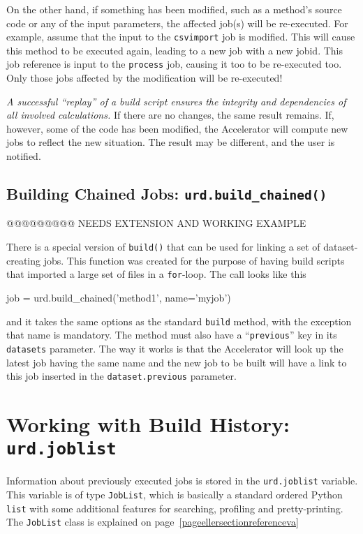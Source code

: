 On the other hand, if something has been modified, such as a method's
source code or any of the input parameters, the affected job(s) will
be re-executed.  For example, assume that the input to
the \texttt{csvimport} job is modified.  This will cause this method
to be executed again, leading to a new job with a new jobid.  This job
reference is input to the \texttt{process} job, causing it too to be
re-executed too.  Only those jobs affected by the modification will be
re-executed!

\textsl{A successful ``replay'' of a build script ensures the integrity and
dependencies of all involved calculations.}  If there are no changes,
the same result remains.  If, however, some of the code has been
modified, the Accelerator will compute new jobs to reflect the new
situation.  The result may be different, and the user is notified.



\subsection{Building Chained Jobs: \texttt{urd.build\_chained()}}

@@@@@@@@@ NEEDS EXTENSION AND WORKING EXAMPLE

There is a special version of \texttt{build()} that can be used for
linking a set of dataset-creating jobs.  This function was created for
the purpose of having build scripts that imported a large set of files
in a \texttt{for}-loop.  The call looks like this
\begin{python}
job = urd.build_chained('method1', name='myjob')
\end{python}
and it takes the same options as the standard \texttt{build} method,
with the exception that name is mandatory.  The method must also have
a ``\texttt{previous}'' key in its \texttt{datasets} parameter.  The
way it works is that the Accelerator will look up the latest job
having the same name and the new job to be built will have a link to
this job inserted in the \texttt{dataset.previous} parameter.







\section{Working with Build History:  \texttt{urd.joblist}}
\label{sec:joblist}

Information about previously executed jobs is stored in
the \texttt{urd.joblist} variable.  This variable is of
type \texttt{JobList}, which is basically a standard ordered
Python \texttt{list} with some additional features for searching,
profiling and pretty-printing.  The \texttt{JobList} class is explained on page~\ref{pageellersectionreferenceva}



